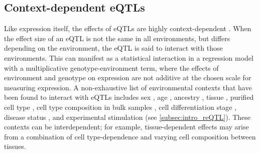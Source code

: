 \subsection{Context-dependent eQTLs}
\label{subsec:intro_contextDependenteQTL}

Like expression itself, the effects of \glspl{eQTL} are highly context-dependent \autocite{albert2015RoleRegulatoryVariation,vandiedonck2017GeneticAssociationMolecular}.
When the effect size of an \gls{eQTL} is not the same in all environments, 
but differs depending on the environment, 
the \gls{eQTL} is said to interact with those environments.
This can manifest as a statistical interaction in a regression model with a multiplicative genotype-environment term,
where the effects of environment and genotype on expression are not additive at the chosen scale for measuring expression.
A non-exhaustive list of environmental contexts that have been found to interact with \glspl{eQTL} includes
    sex \autocite{yao2014SexAgeinteractingEQTLs},
    age \autocite{yao2014SexAgeinteractingEQTLs},
    ancestry \autocite{dejager2015ImmVarProjectInsights,nedelec2016GeneticAncestryNatural,quach2017LivingAdaptiveWorld},
    tissue \autocite{nica2011ArchitectureGeneRegulatory,aguet2017GeneticEffectsGene},
    purified cell type \autocite{dimas2009CommonRegulatoryVariation,dejager2015ImmVarProjectInsights,peters2016InsightGenotypePhenotypeAssociations,chen2016GeneticDriversEpigenetic,calderon2019LandscapeStimulationresponsiveChromatin},
    cell type composition in bulk samples \autocite{westra2015CellSpecificEQTL,zhernakova2017IdentificationContextdependentExpression,glastonbury2019CellTypeHeterogeneityAdipose,kim-hellmuth2020CellTypeSpecific},
    cell differentiation stage \autocite{strober2019DynamicGeneticRegulation},
    disease status \autocite{peters2016InsightGenotypePhenotypeAssociations},
    and experimental stimulation (see \cref{subsec:intro_reQTL}).
These contexts can be interdependent;
for example, tissue-dependent effects may arise from a combination of cell type-dependence and varying cell composition between tissues.


